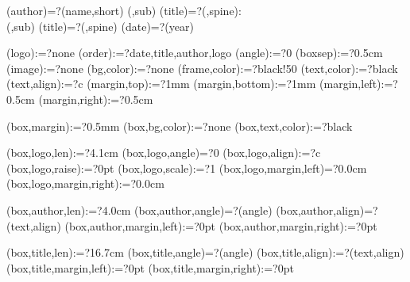 
%


\makeatletter




\spine(author)=?{\thedocauthor(name,short)}
(\@LANG@COVER,sub){%
  \spine(title)=?{\thedoctitle(\@LANG@COVER,spine):\\\thedoctitle(\@LANG@COVER,sub)}
}{%
  \spine(title)=?{\thedoctitle(\@LANG@COVER,spine)}
}
\spine(date)=?{\thentdocdate(year)}


\spine(logo):=?{none}
\spine(order):=?{date,title,author,logo}
\spine(angle):=?{0}
\spine(boxsep):=?{0.5cm}
\spine(image):=?{none}
\spine(bg,color):=?{none}
\spine(frame,color):=?{black!50}
\spine(text,color):=?{black}
\spine(text,align):=?{c}
\spine(margin,top):=?{1mm}
\spine(margin,bottom):=?{1mm}
\spine(margin,left):=?{0.5cm}
\spine(margin,right):=?{0.5cm}

\spine(box,margin):=?{0.5mm}
\spine(box,bg,color):=?{none}
\spine(box,text,color):=?{black}

\spine(box,logo,len):=?{4.1cm}
\spine(box,logo,angle)=?{0}
\spine(box,logo,align):=?{c}
\spine(box,logo,raise):=?{0pt}
\spine(box,logo,scale):=?{1}
\spine(box,logo,margin,left)=?{0.0cm}
\spine(box,logo,margin,right):=?{0.0cm}

\spine(box,author,len):=?{4.0cm}
\spine(box,author,angle)=?{\thespine(angle)}
\spine(box,author,align)=?{\thespine(text,align)}
\spine(box,author,margin,left):=?{0pt}
\spine(box,author,margin,right):=?{0pt}

\spine(box,title,len):=?{16.7cm}
\spine(box,title,angle)=?{\thespine(angle)}
\spine(box,title,align):=?{\thespine(text,align)}
\spine(box,title,margin,left):=?{0pt}
\spine(box,title,margin,right):=?{0pt}

